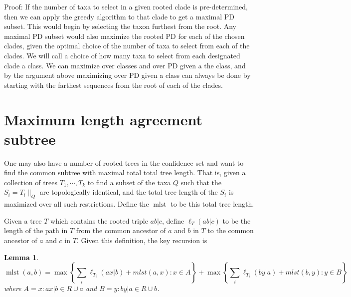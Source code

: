\documentclass{amsart}
\newcommand{\mlst}{\operatorname{mlst}}
\newtheorem{lemma}{Lemma}
\begin{document}
Proof:
If the number of taxa to select in a given rooted clade is pre-determined, then we can apply the greedy algorithm to that clade to get a maximal PD subset.
This would begin by selecting the taxon furthest from the root.
Any maximal PD subset would also maximize the rooted PD for each of the chosen clades, given the optimal choice of the number of taxa to select from each of the clades.
We will call a choice of how many taxa to select from each designated clade a class.
We can maximize over classes and over PD given a the class, and by the argument above maximizing over PD given a class can always be done by starting with the farthest sequences from the root of each of the clades.



\section{Maximum length agreement subtree}

One may also have a number of rooted trees in the confidence set and want to find the common subtree with maximal total total tree length.
That is, given a collection of trees $T_1,\cdots,T_k$ to find a subset of the taxa $Q$ such that the $S_i = T_i \|_Q$ are topologically identical, and the total tree length of the $S_i$ is maximized over all such restrictions.
Define the $\mlst$ to be this total tree length.

Given a tree $T$ which contains the rooted triple $ab|c$, define $\ell_T(ab|c)$ to be the length of the path in $T$ from the common ancestor of $a$ and $b$ in $T$ to the common ancestor of $a$ and $c$ in $T$.
Given this definition, the key recursion is
\begin{lemma}
  \[
  \mlst(a,b) =
  \max \left\{ \sum_i \ell_{T_i} (ax|b) + mlst(a,x) : x \in A \right\} +
  \max \left\{ \sum_i \ell_{T_i} (by|a) + mlst(b,y) : y \in B \right\}
  \]
  where $A = {x: ax|b \in R} \cup {a}$ and $B = {y: by|a \in R} \cup {b}$.
\end{lemma}





\end{document}
